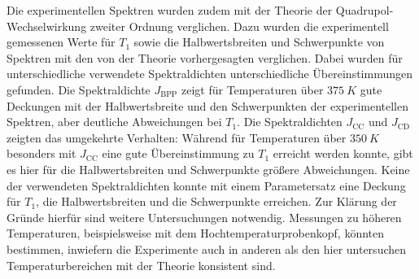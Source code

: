 Die experimentellen Spektren wurden zudem mit der Theorie der Quadrupol-Wech\-sel\-wir\-kung zweiter Ordnung verglichen. Dazu wurden die experimentell gemessenen Werte für $T_1$ sowie die Halbwertsbreiten und Schwerpunkte von Spektren mit den von der Theorie vorhergesagten verglichen. Dabei wurden für unterschiedliche verwendete Spektraldichten unterschiedliche Übereinstimmungen gefunden. Die Spektraldichte $J_\text{BPP}$ zeigt für Temperaturen über $\SI{375}{K}$ gute Deckungen mit der Halbwertsbreite und den Schwerpunkten der experimentellen Spektren, aber deutliche Abweichungen bei $T_1$. Die Spektraldichten $J_\text{CC}$ und $J_\text{CD}$ zeigten das umgekehrte Verhalten: Während für Temperaturen über $\SI{350}{K}$ besonders mit $J_\text{CC}$ eine gute Übereinstimmung zu $T_1$ erreicht werden konnte, gibt es hier für die Halbwertsbreiten und Schwerpunkte größere Abweichungen. Keine der verwendeten Spektraldichten konnte mit einem Parametersatz eine Deckung für $T_1$, die Halbwertsbreiten und die Schwerpunkte erreichen. Zur Klärung der Gründe hierfür sind weitere Untersuchungen notwendig. Messungen zu höheren Temperaturen, beispielsweise mit dem Hochtemperaturprobenkopf, könnten bestimmen, inwiefern die Experimente auch in anderen als den hier untersuchen Temperaturbereichen mit der Theorie konsistent sind.


